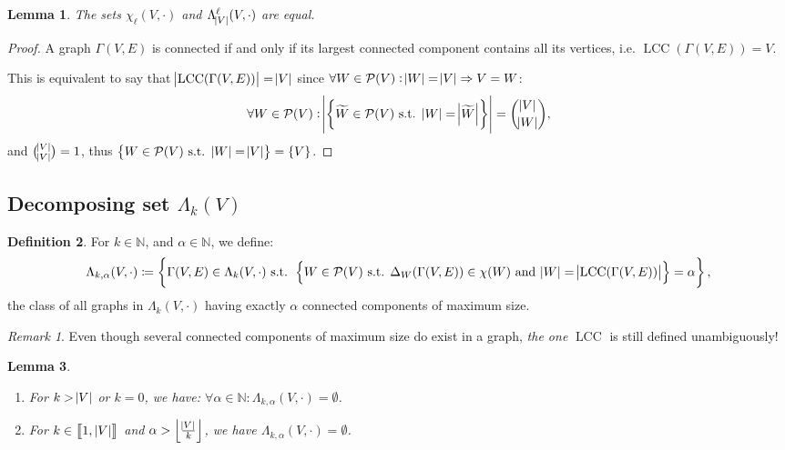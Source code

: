 \documentclass{article}
\newtheorem{lemma}{Lemma}[section]
\theoremstyle{definition}
\newtheorem{definition}[lemma]{Definition}
\theoremstyle{remark}
\newtheorem*{remark}{Remark}
\DeclareMathOperator{\LCC}{LCC}
\newcommand{\N}{\mathbb N}
\newcommand{\intint}[2]{\left\llbracket#1, \, #2\right\rrbracket}
\newcommand{\floor}[1]{\left\lfloor#1\right\rfloor}
\newcommand{\st}{\text{ s.t. }}
\begin{document}
	\begin{lemma} The sets $\chi_\ell(V, \cdot)$ and $\Lambda_{\abs V}^\ell(V, \cdot)$ are equal.
	\end{lemma}

	\begin{proof} A graph $\Gamma(V, E)$ is connected if and only if its largest connected component contains all its vertices, i.e. $\LCC(\Gamma(V, E)) = V$.

	This is equivalent to say that $\abs {\LCC(\Gamma(V, E))} = \abs V$ since $\forall W \in \mathcal P(V) : \abs W = \abs V \Rightarrow V = W$:
	\[\forall W \in \mathcal P(V) : \abs {\left\{\widetilde W \in \mathcal P(V) \st \abs W = \abs {\widetilde W}\right\}} = \binom {\abs V}{\abs W},\]
	and $\binom {\abs V}{\abs V} = 1$, thus $\left\{W \in \mathcal P(V) \st \abs W = \abs V\right\} = \{V\}$.
	\end{proof}

	\subsection{Decomposing set $\Lambda_k(V)$}
		\begin{definition} For $k \in \N$, and $\alpha \in \N$, we define:
		\[\Lambda_{k,\alpha}(V, \cdot) \coloneqq \left\{\Gamma(V, E) \in \Lambda_k(V, \cdot) \st
			\left\{W \in \mathcal P(V) \st \Delta_W(\Gamma(V, E)) \in \chi(W) \text{ and } \abs W = \abs {\LCC(\Gamma(V, E))}\right\} = \alpha\right\},\]
		the class of all graphs in $\Lambda_k(V, \cdot)$ having exactly $\alpha$ connected components of maximum size.
		\end{definition}

		\begin{remark} Even though several connected components of maximum size do exist in a graph, \textit{the one} $\LCC$ is still defined unambiguously!
		\end{remark}

		\begin{lemma}~
		\begin{enumerate}
			\item For $k > \abs V$ or $k=0$, we have: $\forall \alpha \in \N : \Lambda_{k,\alpha}(V, \cdot) = \emptyset$.
			\item For $k \in \intint 1{\abs V}$ and $\alpha > \floor {\frac {\abs V}k}$, we have $\Lambda_{k,\alpha}(V, \cdot) = \emptyset$.
		\end{enumerate}
		\end{lemma}
\end{document}
